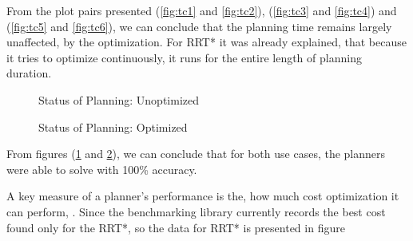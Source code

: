 From the plot pairs presented (\ref{fig:tc1} and \ref{fig:tc2}), (\ref{fig:tc3} and \ref{fig:tc4}) and (\ref{fig:tc5} and \ref{fig:tc6}), we can conclude that the planning time remains largely unaffected, by the optimization. For RRT* it was already explained, that because it tries to optimize continuously, it runs for the entire length of planning duration. 

\begin{figure}[!htbp] %
	\centering
	\caption{Status of Planning: Unoptimized}
	\label{fig:stc1}
\end{figure}
\begin{figure}[!htbp] %
	\centering
	\caption{Status of Planning: Optimized}
	\label{fig:stc2}
\end{figure}
From figures (\ref{fig:stc1} and \ref{fig:stc2}), we can conclude that for both use cases, the planners were able to solve with 100\% accuracy.

A key measure of a planner's performance is the, how much cost optimization it can perform, \citet{sucan2012the-open-motion-planning-library}. Since the benchmarking library currently records the best cost found only for the RRT*, so the data for RRT* is presented in figure 

